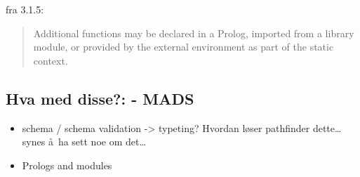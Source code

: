 fra 3.1.5:
\begin{quote}
  Additional functions may be declared in a Prolog, imported from a library module, or provided by the external
  environment as part of the static context.
  \end{quote}


\subsection{Hva med disse?: - {MADS}}

  	\begin{itemize}
  		\item schema / schema validation -> typeting? Hvordan l\o ser pathfinder dette\ldots synes \aa~ha sett noe om
  		det\ldots
  		\item Prologs and modules
  		\end{itemize}

